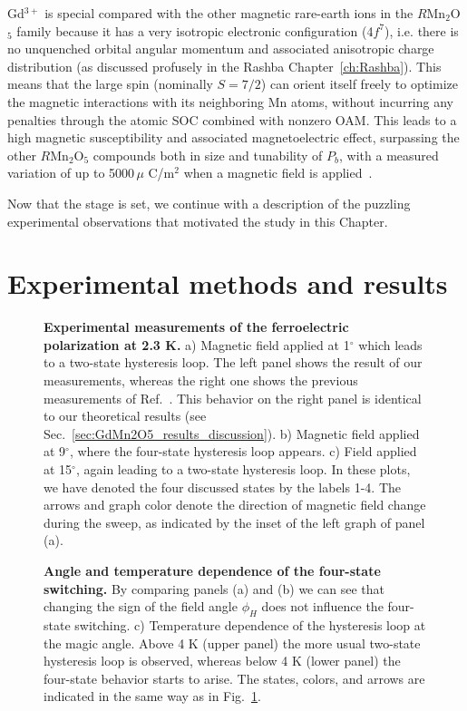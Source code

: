 Gd$^{3+}$ is special compared with the other magnetic rare-earth ions in the $R$Mn$_2$O$_5$ family because it has a very isotropic electronic configuration (4$f^7$), i.e. there is no unquenched orbital angular momentum and associated anisotropic charge distribution (as discussed profusely in the Rashba Chapter~\ref{ch:Rashba}). This means that the large spin (nominally $S=7/2$) can orient itself freely to optimize the magnetic interactions with its neighboring Mn atoms, without incurring any penalties through the atomic \gls{SOC} combined with nonzero \gls{OAM}.
This leads to a high magnetic susceptibility and associated magnetoelectric effect, surpassing the other $R$Mn$_2$O$_5$ compounds both in size and tunability of $P_b$, with a measured variation of up to 5000\,$\mu$ C/m$^2$ when a magnetic field is applied~\cite{Lee13}. 

Now that the stage is set, we continue with a description of the puzzling experimental observations that motivated the study in this Chapter.

\section{Experimental methods and results \label{sec:GdMn2O5_experiment}}
\begin{figure}
    \centering
\caption{ \label{fig:GdMn2O5_experiment1} {\bf Experimental measurements of the ferroelectric polarization at 2.3 K.} a) Magnetic field applied at 1$^\circ$ which leads to a two-state hysteresis loop. The left panel shows the result of our measurements, whereas the right one shows the previous measurements of Ref.~\cite{Lee13}. This behavior on the right panel is identical to our theoretical results (see Sec.~\ref{sec:GdMn2O5_results_discussion}). b) Magnetic field applied at 9$^\circ$, where the four-state hysteresis loop appears. c) Field applied at 15$^\circ$, again leading to a two-state hysteresis loop.  
In these plots, we have denoted the four discussed states by the labels 1-4. The arrows and graph color denote the direction of magnetic field change during the sweep, as indicated by the inset of the left graph of panel (a).}
\end{figure}
\begin{figure}
    \centering
\caption{ \label{fig:GdMn2O5_experiment2} {\bf Angle and temperature dependence of the four-state switching.} By comparing panels (a) and (b) we can see that changing the sign of the field angle $\phi_H$ does not influence the four-state switching. c) Temperature dependence of the hysteresis loop at the magic angle. Above 4 K (upper panel) the more usual two-state hysteresis loop is observed, whereas below 4 K (lower panel) the four-state behavior starts to arise. The states, colors, and arrows are indicated in the same way as in Fig.~\ref{fig:GdMn2O5_experiment1}.}
\end{figure}

